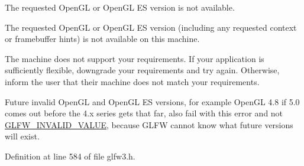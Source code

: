 The requested OpenGL or OpenGL ES version is not available. 

The requested OpenGL or OpenGL ES version (including any requested context or framebuffer hints) is not available on this machine.

The machine does not support your requirements. If your application is sufficiently flexible, downgrade your requirements and try again. Otherwise, inform the user that their machine does not match your requirements.

\begin{Desc}
\item[]Future invalid OpenGL and OpenGL ES versions, for example OpenGL 4.8 if 5.0 comes out before the 4.x series gets that far, also fail with this error and not \hyperlink{group__errors_gaf2ef9aa8202c2b82ac2d921e554c687}{GLFW\_\-INVALID\_\-VALUE}, because GLFW cannot know what future versions will exist. \end{Desc}


Definition at line 584 of file glfw3.h.